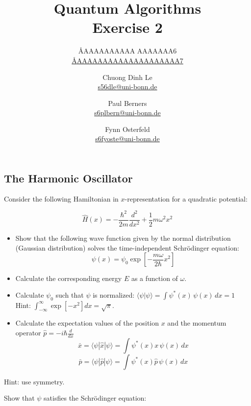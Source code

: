 \documentclass{article}
\title{Quantum Algorithms \\ Exercise 2}
\author{
  \AA{AAAAAAAAAA AAAAAAA}{6} \\ \href{mailto:\AA{AAAAAAAAAAAAAAAAAAAA}{7}}{\AA{AAAAAAAAAAAAAAAAAAAA}{7}} \and
  Chuong Dinh Le \\ \href{mailto:s56dle@uni-bonn.de}{s56dle@uni-bonn.de} \and
  Paul Berners \\ \href{mailto:s6plbern@uni-bonn.de}{s6plbern@uni-bonn.de} \and
  Fynn Osterfeld \\ \href{mailto:s6fyoste@uni-bonn.de}{s6fyoste@uni-bonn.de}
}
\begin{document}
  \maketitle

  \setcounter{section}{2}
  \subsection{The Harmonic Oscillator}
  \begin{centerframebox}
    Consider the following Hamiltonian in $x$-representation for a quadratic potential:

    \[ \hat{H}(x) = -\frac{\hbar^{2}}{2m}\frac{d^{2}}{d x^{2}}+\frac{1}{2}m\omega^{2}x^{2} \]

    \begin{itemize}
      \item Show that the following wave function given by the normal distribution (Gaussian distribution) solves the time-independent Schrödinger equation:
      \[ \psi(x) = \psi_0\exp\left[-\frac{m\omega}{2\hbar}x^{2}\right] \]
      \item Calculate the corresponding energy $E$ as a function of $\omega$.
      \item Calculate $\psi_0$ such that $\psi$ is normalized: $\langle\psi|\psi\rangle = \int\psi^{*}(x)\,\psi(x)\, dx = 1$ \\
      Hint: ${\int}_{-\infty}^{\infty}\exp[-x^{2}] dx = {\sqrt{\pi}}$.
      \item Calculate the expectation values of the position $x$ and the momentum operator $\hat{p} = -i\hbar \frac{d}{d x}$
      \[ \bar{x} = \langle\psi|\hat{x}|\psi\rangle = \int\psi^{*}(x) x\, \psi(x)\, dx \]
      \[ \bar{p} = \langle\psi|\hat{p}|\psi\rangle = \int\psi^{*}(x) \hat{p}\, \psi(x)\, dx \]
    \end{itemize}

    Hint: use symmetry.
  \end{centerframebox}
  Show that $\psi$ satisfies the Schrödinger equation:
\end{document}

